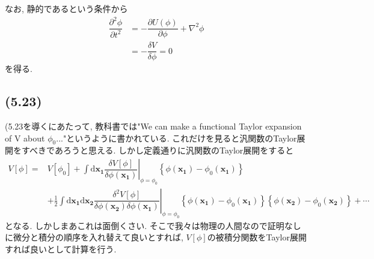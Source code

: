 \documentclass[dvipdfmx,11pt,a4paper,oneside,openany]{jsbook}
\begin{document}
なお, 静的であるという条件から
\begin{align}
    \dfrac{\partial^2 \phi}{\partial t^2} & =-\dfrac{\partial U(\phi)}{\partial \phi}+\nabla^2\phi\nonumber \\
                                          & =-\dfrac{\delta V}{\delta \phi
    }=0\label{eq:5.22}
\end{align}
を得る.



\newpage
\subsection{(5.23)}
(5.23を導くにあたって, 教科書では"We can make a functional Taylor expansion of V about $\phi_0$..."というように書かれている. これだけを見ると汎関数のTaylor展開をすべきであろうと思える. しかし定義通りに汎関数のTaylor展開をすると
\begin{align*}
    V[\phi]= & V[\phi_0]+\left.\int\mathrm{d}\bm{x_1}\dfrac{\delta V[\phi]}{\delta \phi(\bm{x_1})}\right|_{\phi=\phi_0}\left\{\phi(\bm{x_1})-\phi_0(\bm{x_1})\right\}                                                                                              \\
             & +\frac{1}{2}\left.\int\mathrm{d}\bm{x_1}\mathrm{d}\bm{x_2}\dfrac{\delta^2V[\phi]}{\delta\phi(\bm{x_2})\delta\phi(\bm{x_1})}\right|_{\phi=\phi_0}\left\{\phi(\bm{x_1})-\phi_0(\bm{x_1})\right\}\left\{\phi(\bm{x_2})-\phi_0(\bm{x_2})\right\}+\cdots
\end{align*}
となる. しかしまあこれは面倒くさい. そこで我々は物理の人間なので証明なしに微分と積分の順序を入れ替えて良いとすれば, $V[\phi]$の被積分関数をTaylor展開すれば良いとして計算を行う.
\end{document}
